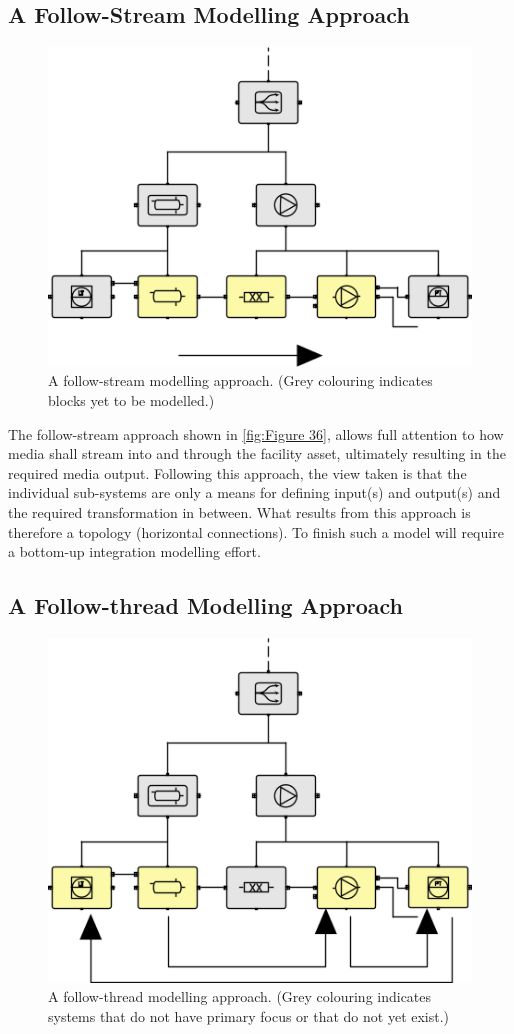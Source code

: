 \documentclass[../main.tex]{subfiles}
\begin{document}
\subsection{A Follow-Stream Modelling Approach}

\begin{figure}[htb]
  \centering
  \includegraphics[width=.5\textwidth]{img/IMFmanual-img055.png}
  \caption[A follow-stream modelling approach.]{A follow-stream modelling approach. (Grey colouring indicates blocks yet to be modelled.)}
  \label{fig:Figure 36}
\end{figure}

The follow-stream approach shown in \autoref{fig:Figure 36}, allows full attention to how media shall stream into and through the
facility asset, ultimately resulting in the required media output. Following this approach, the view taken is that
the individual sub-systems are only a means for defining input(s) and output(s) and the required transformation in
between. What results from this approach is therefore a topology (horizontal connections). To finish such a model
will require a bottom-up integration modelling effort. 

\subsection{A Follow-thread Modelling Approach}
\begin{figure}[htb]
  \centering
  \includegraphics[width=.5\textwidth]{img/IMFmanual-img056.png}
  \caption[A follow-thread modelling approach.]{A follow-thread modelling approach. (Grey colouring indicates systems that do not have primary focus or that do not
yet exist.)}
  \label{fig:Figure 37}
\end{figure}
\end{document}
